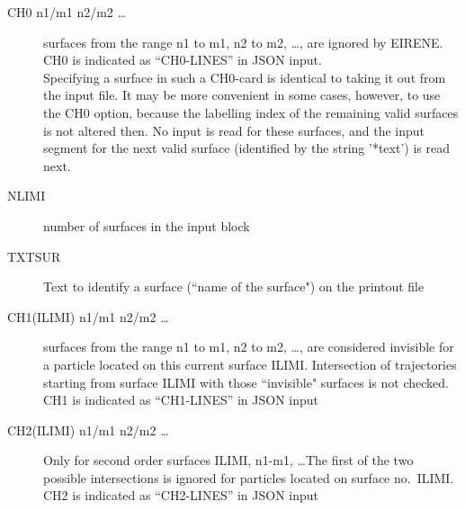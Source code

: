 \begin{description}
  \item[CH0 n1/m1 n2/m2 \dots] 

        surfaces from the range n1 to m1, n2 to m2, \dots, are ignored by EIRENE. \\
        CH0 is indicated as ``CH0-LINES'' in JSON input. \\        
        Specifying a surface in such a CH0-card is identical to taking it out from the
        input file.
        It may be more convenient in some cases, however, to use the CH0 option,
        because the labelling index of the remaining valid surfaces is not altered
        then.
        No input is read for these surfaces, and the input segment for the next valid
        surface (identified by the string '*text') is read next.
  \item[NLIMI] number of surfaces in the input block
  \item[TXTSUR] Text to
        identify a surface (``name of the surface") on the printout file
  \item[CH1(ILIMI) n1/m1 n2/m2 \dots] 

        surfaces from the range n1 to m1, n2 to m2, \dots, are considered invisible for
        a particle located on this current surface ILIMI.
        Intersection of trajectories starting from surface ILIMI with those
        ``invisible" surfaces is not checked. \\        
         CH1 is indicated as ``CH1-LINES'' in JSON input
 \item[CH2(ILIMI) n1/m1 n2/m2 \dots] 

        Only for second order surfaces ILIMI, n1-m1, \dots The first of the two
        possible intersections is ignored for particles located on surface no.\ ILIMI. \\        
        CH2 is indicated as ``CH2-LINES'' in JSON input
\end{description}

